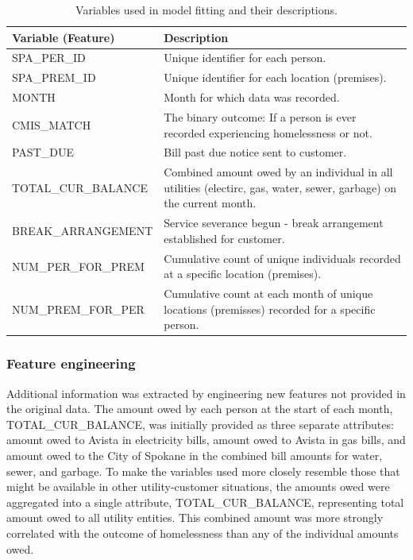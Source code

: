 \documentclass[10pt,letterpaper]{article}
\begin{document}
\begin{table}[!h]
    \centering
    \begin{tabular}{m{4.5cm} | m{7cm}}
        \toprule
        Variable (Feature) &                  Description \\
        \toprule
        SPA\_PER\_ID & Unique identifier for each person. \\
        \midrule
        SPA\_PREM\_ID & Unique identifier for each location (premises). \\
        \midrule
        MONTH & Month for which data was recorded. \\
        \midrule
        CMIS\_MATCH & The binary outcome: If a person is ever recorded experiencing homelessness or not. \\
        \midrule
        PAST\_DUE & Bill past due notice sent to customer. \\
        \midrule
        TOTAL\_CUR\_BALANCE & Combined amount owed by an individual in all utilities (electirc, gas, water, sewer, garbage) on the current month. \\
        \midrule
        BREAK\_ARRANGEMENT & Service severance begun - break arrangement established for customer. \\
        \midrule
        NUM\_PER\_FOR\_PREM & Cumulative count of unique individuals recorded at a specific location (premises). \\
        \midrule
        NUM\_PREM\_FOR\_PER & Cumulative count at each month of unique locations (premisses) recorded for a specific person. \\
        \bottomrule
    \end{tabular}
    \caption[Variables Used]{Variables used in model fitting and their descriptions.}
    \label{tbl:varsUsed}
\end{table}

\subsubsection*{Feature engineering}
Additional information was extracted by engineering new features not provided in the original data. The amount owed by each person at the start of each month, TOTAL\_CUR\_BALANCE, was initially provided as three separate attributes: amount owed to Avista in electricity bills, amount owed to Avista in gas bills, and amount owed to the City of Spokane in the combined bill amounts for water, sewer, and garbage. To make the variables used more closely resemble those that might be available in other utility-customer situations, the amounts owed were aggregated into a single attribute, TOTAL\_CUR\_BALANCE, representing total amount owed to all utility entities. This combined amount was more strongly correlated with the outcome of homelessness than any of the individual amounts owed.
\end{document}

